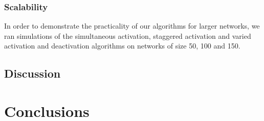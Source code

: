 \documentclass[english]{article}
\begin{document}
\subsubsection{Scalability}

In order to demonstrate the practicality of our algorithms for larger networks, we ran simulations of the simultaneous activation, staggered activation and varied activation and deactivation algorithms on networks of size 50, 100 and 150.









\subsection{Discussion}





\section{Conclusions}
\end{document}
